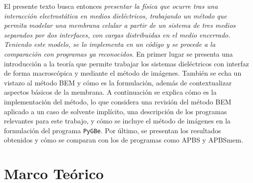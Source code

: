 \documentclass[12pt, notitlepage]{article}
\numberwithin{equation}{section}
\begin{document}
El presente texto busca entonces \textit{presentar la física que ocurre tras una interacción electrostática en medios dieléctricos, trabajando un método que permita modelar una membrana celular a partir de un sistema de tres medios separados por dos interfaces, con cargas distribuidas en el medio encerrado. Teniendo este modelo, se lo implementa en un código y se procede a la comparación con programas ya reconocidos}.
En primer lugar se presenta una introducción a la teoría que permite trabajar los sistemas dieléctricos con interfaz de forma macroscópica y mediante el método de imágenes. También se echa un vistazo al método BEM y cómo es la formulación, además de contextualizar aspectos básicos de la membrana. A continuación se explica cómo es la implementación del método, lo que considera una revisión del método BEM aplicado a un caso de solvente implícito, una descripción de los programas relevantes para este trabajo, y cómo se incluye el método de imágenes en la formulación del programa \texttt{PyGBe}. Por último, se presentan los resultados obtenidos y cómo se comparan con los de programas como APBS y APBSmem.




\section{Marco Teórico}
\end{document}
